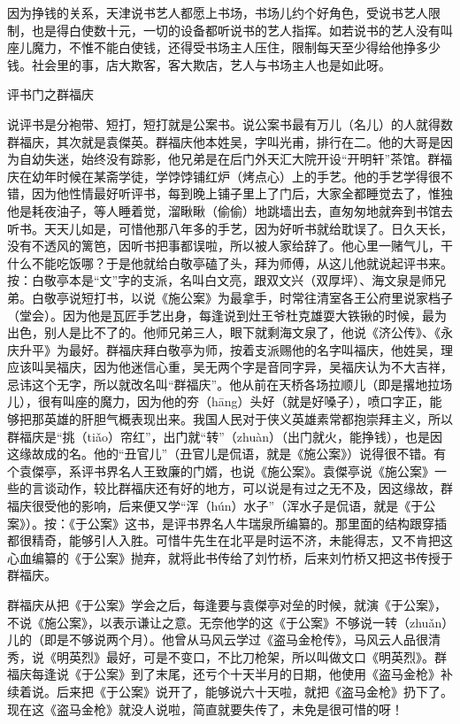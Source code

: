 \documentclass[12pt,UTF8]{ctexbook}
\begin{document}
因为挣钱的关系，天津说书艺人都愿上书场，书场儿约个好角色，受说书艺人限制，也是得白使数十元，一切的设备都听说书的艺人指挥。如若说书的艺人没有叫座儿魔力，不惟不能白使钱，还得受书场主人压住，限制每天至少得给他挣多少钱。社会里的事，店大欺客，客大欺店，艺人与书场主人也是如此呀。





评书门之群福庆


说评书是分袍带、短打，短打就是公案书。说公案书最有万儿（名儿）的人就得数群福庆，其次就是袁傑英。群福庆他本姓吴，字叫光甫，排行在二。他的大哥是因为自幼失迷，始终没有踪影，他兄弟是在后门外天汇大院开设“开明轩”茶馆。群福庆在幼年时候在某斋学徒，学饽饽铺红炉（烤点心）上的手艺。他的手艺学得很不错，因为他性情最好听评书，每到晚上铺子里上了门后，大家全都睡觉去了，惟独他是耗夜油子，等人睡着觉，溜瞅瞅（偷偷）地跳墙出去，直匆匆地就奔到书馆去听书。天天儿如是，可惜他那八年多的手艺，因为好听书就给耽误了。日久天长，没有不透风的篱笆，因听书把事都误啦，所以被人家给辞了。他心里一赌气儿，干什么不能吃饭哪？于是他就给白敬亭磕了头，拜为师傅，从这儿他就说起评书来。按：白敬亭本是“文”字的支派，名叫白文亮，跟双文兴（双厚坪）、海文泉是师兄弟。白敬亭说短打书，以说《施公案》为最拿手，时常往清室各王公府里说家档子（堂会）。因为他是瓦匠手艺出身，每逢说到灶王爷杜克雄耍大铁锹的时候，最为出色，别人是比不了的。他师兄弟三人，眼下就剩海文泉了，他说《济公传》、《永庆升平》为最好。群福庆拜白敬亭为师，按着支派赐他的名字叫福庆，他姓吴，理应该叫吴福庆，因为他迷信心重，吴无两个字是音同字异，吴福庆认为不大吉祥，忌讳这个无字，所以就改名叫“群福庆”。他从前在天桥各场拉顺儿（即是撂地拉场儿），很有叫座的魔力，因为他的夯（hāng）头好（就是好嗓子），喷口字正，能够把那英雄的肝胆气概表现出来。我国人民对于侠义英雄素常都抱崇拜主义，所以群福庆是“挑（tiǎo）帘红”，出门就“转”（zhuàn）（出门就火，能挣钱），也是因这缘故成的名。他的“丑官儿”（丑官儿是侃语，就是《施公案》）说得很不错。有个袁傑亭，系评书界名人王致廉的门婿，也说《施公案》。袁傑亭说《施公案》一些的言谈动作，较比群福庆还有好的地方，可以说是有过之无不及，因这缘故，群福庆很受他的影响，后来便又学“浑（hún）水子”（浑水子是侃语，就是《于公案》）。按：《于公案》这书，是评书界名人牛瑞泉所编纂的。那里面的结构跟穿插都很精奇，能够引人入胜。可惜牛先生在北平是时运不济，未能得志，又不肯把这心血编纂的《于公案》抛弃，就将此书传给了刘竹桥，后来刘竹桥又把这书传授于群福庆。

群福庆从把《于公案》学会之后，每逢要与袁傑亭对垒的时候，就演《于公案》，不说《施公案》，以表示谦让之意。无奈他学的这《于公案》不够说一转（zhuǎn）儿的（即是不够说两个月）。他曾从马风云学过《盗马金枪传》，马风云人品很清秀，说《明英烈》最好，可是不变口，不比刀枪架，所以叫做文口《明英烈》。群福庆每逢说《于公案》到了末尾，还亏个十天半月的日期，他使用《盗马金枪》补续着说。后来把《于公案》说开了，能够说六十天啦，就把《盗马金枪》扔下了。现在这《盗马金枪》就没人说啦，简直就要失传了，未免是很可惜的呀！
\end{document}
